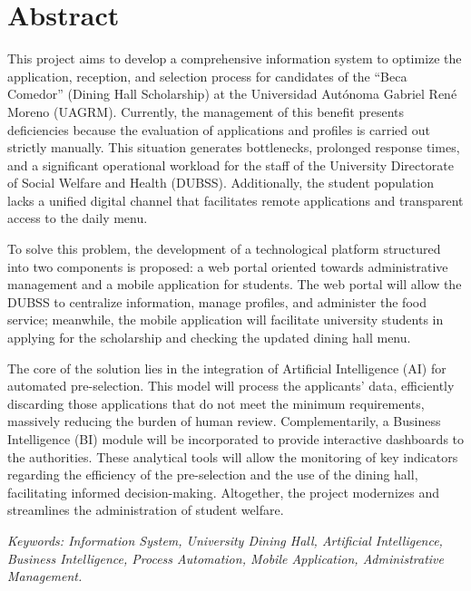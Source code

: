 
\section*{Abstract}

This project aims to develop a comprehensive information system to optimize the application, reception, and selection process for candidates of the \enquote{Beca Comedor} (Dining Hall Scholarship) at the Universidad Autónoma Gabriel René Moreno (UAGRM). Currently, the management of this benefit presents deficiencies because the evaluation of applications and profiles is carried out strictly manually. This situation generates bottlenecks, prolonged response times, and a significant operational workload for the staff of the University Directorate of Social Welfare and Health (DUBSS). Additionally, the student population lacks a unified digital channel that facilitates remote applications and transparent access to the daily menu.

To solve this problem, the development of a technological platform structured into two components is proposed: a web portal oriented towards administrative management and a mobile application for students. The web portal will allow the DUBSS to centralize information, manage profiles, and administer the food service; meanwhile, the mobile application will facilitate university students in applying for the scholarship and checking the updated dining hall menu.

The core of the solution lies in the integration of Artificial Intelligence (AI) for automated pre-selection. This model will process the applicants' data, efficiently discarding those applications that do not meet the minimum requirements, massively reducing the burden of human review. Complementarily, a Business Intelligence (BI) module will be incorporated to provide interactive dashboards to the authorities. These analytical tools will allow the monitoring of key indicators regarding the efficiency of the pre-selection and the use of the dining hall, facilitating informed decision-making. Altogether, the project modernizes and streamlines the administration of student welfare.

\indent\textit{Keywords: Information System, University Dining Hall, Artificial Intelligence, Business Intelligence, Process Automation, Mobile Application, Administrative Management.}